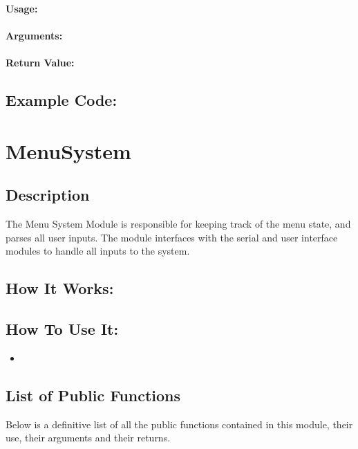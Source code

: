 \documentclass[]{report}
\begin{document}
\subsection{}
\subsubsection{Usage:}

\subsubsection{Arguments:}

\subsubsection{Return Value:}

\section{Example Code:}

\chapter{MenuSystem}
\section{Description}
The Menu System Module is responsible for keeping track of the menu state, and parses all user inputs. The module interfaces with the serial and user interface modules to handle all inputs to the system.

\section{How It Works:}

\section{How To Use It:}
\begin{itemize}
	\item 
\end{itemize}

\section{List of Public Functions}
Below is a definitive list of all the public functions contained in this module, their use, their arguments and their returns.
\end{document}
